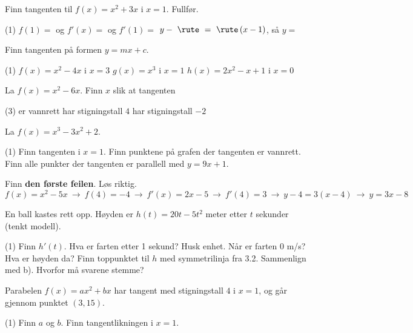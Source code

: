 
Finn tangenten til $f(x) = x^2 + 3x$ i $x = 1$. Fullfør.
\begin{tasks}(1)
  \task $f(1) =$ \skrivlinje[2cm] \quad og \quad $f'(x) =$ \skrivlinje[3cm] \quad og \quad $f'(1) =$ \skrivlinje[2cm]
  \task $y - \ \rute\ = \ \rute\,(x - 1)$, så $y =$ \skrivlinje[3cm]
\end{tasks}

Finn tangenten på formen $y = mx + c$.
\begin{tasks}(1)
  \task $f(x) = x^2 - 4x$ i $x = 3$
  \task $g(x) = x^3$ i $x = 1$
  \task $h(x) = 2x^2 - x + 1$ i $x = 0$
\end{tasks}

La $f(x) = x^2 - 6x$. Finn $x$ slik at tangenten
\begin{tasks}(3)
  \task er vannrett
  \task har stigningstall $4$
  \task har stigningstall $-2$
\end{tasks}


La $f(x) = x^3 - 3x^2 + 2$.
\begin{tasks}(1)
  \task Finn tangenten i $x = 1$.
  \task Finn punktene på grafen der tangenten er vannrett.
  \task Finn alle punkter der tangenten er parallell med $y = 9x + 1$.
\end{tasks}

Finn \textbf{den første feilen}. Løs riktig.
\[ f(x) = x^2 - 5x \ \longrightarrow\ f(4) = -4 \ \longrightarrow\ f'(x) = 2x - 5 \ \longrightarrow\ f'(4) = 3 \ \longrightarrow\ y - 4 = 3(x - 4) \ \longrightarrow\ y = 3x - 8 \]

En ball kastes rett opp. Høyden er $h(t) = 20t - 5t^2$ meter etter $t$ sekunder (tenkt modell).
\begin{tasks}(1)
  \task Finn $h'(t)$. Hva er farten etter 1 sekund? Husk enhet.
  \task Når er farten $0$ m/s? Hva er høyden da?
  \task Finn toppunktet til $h$ med symmetrilinja fra 3.2. Sammenlign med b). Hvorfor må svarene stemme?
\end{tasks}


Parabelen $f(x) = ax^2 + bx$ har tangent med stigningstall $4$ i $x = 1$, og går gjennom punktet $(3, 15)$.
\begin{tasks}(1)
  \task Finn $a$ og $b$.
  \task Finn tangentlikningen i $x = 1$.
\end{tasks}

